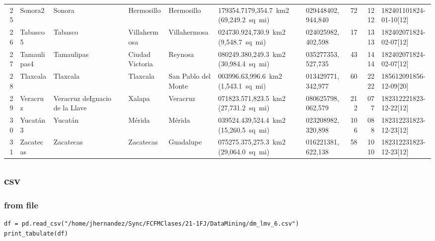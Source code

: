 \documentclass[11pt]{article}
\begin{document}
\begin{center}
\begin{tabular}{rlllllllrrl}
25 & Sonora2 & Sonora &  & Hermosillo & Hermosillo & 179354.7179,354.7 km2 (69,249.2 sq mi) & 029448402,944,840 & 72 & 1212 & 182401101824-01-10[12]\\
26 & Tabasco5 & Tabasco &  & Villahermosa & Villahermosa & 024730.924,730.9 km2 (9,548.7 sq mi) & 024025982,402,598 & 17 & 1313 & 182402071824-02-07[12]\\
27 & Tamaulipas4 & Tamaulipas &  & Ciudad Victoria & Reynosa & 080249.380,249.3 km2 (30,984.4 sq mi) & 035277353,527,735 & 43 & 1414 & 182402071824-02-07[12]\\
28 & Tlaxcala & Tlaxcala &  & Tlaxcala & San Pablo del Monte & 003996.63,996.6 km2 (1,543.1 sq mi) & 013429771,342,977 & 60 & 2222 & 185612091856-12-09[20]\\
29 & Veracruz & Veracruz deIgnacio de la Llave &  & Xalapa & Veracruz & 071823.571,823.5 km2 (27,731.2 sq mi) & 080625798,062,579 & 212 & 077 & 182312221823-12-22[12]\\
30 & Yucatán3 & Yucatán &  & Mérida & Mérida & 039524.439,524.4 km2 (15,260.5 sq mi) & 023208982,320,898 & 106 & 088 & 182312231823-12-23[12]\\
31 & Zacatecas & Zacatecas &  & Zacatecas & Guadalupe & 075275.375,275.3 km2 (29,064.0 sq mi) & 016221381,622,138 & 58 & 1010 & 182312231823-12-23[12]\\
\end{tabular}
\end{center}
\subsection{csv}
\label{sec:org38cd943}
\subsubsection{from file}
\label{sec:orga1e15b0}
\begin{verbatim}
df = pd.read_csv("/home/jhernandez/Sync/FCFMClases/21-1FJ/DataMining/dm_lmv_6.csv")
print_tabulate(df)
\end{verbatim}
\end{document}
